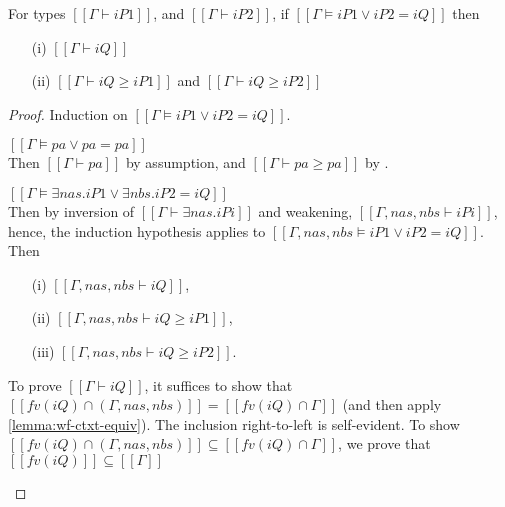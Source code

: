 \begin{lemma}
  \label{lemma:lub-soundness}
  For types $[[Γ ⊢ iP1]]$, and $[[Γ ⊢ iP2]]$,
  if $[[Γ ⊨ iP1 ∨ iP2 = iQ]]$ then
  \begin{enumerate}
    \item[(i)]  $[[Γ ⊢ iQ]]$
    \item[(ii)] $[[Γ ⊢ iQ ≥ iP1]]$ and $[[Γ ⊢ iQ ≥ iP2]]$
  \end{enumerate}
\end{lemma}
\begin{proof}
  Induction on $[[Γ ⊨ iP1 ∨ iP2 = iQ]]$.
  \begin{caseof}
  \item $[[Γ ⊨ pa ∨ pa = pa]]$\\
     Then $[[Γ ⊢ pa]]$ by assumption, and
     $[[Γ ⊢ pa ≥ pa]]$ by .
   \item $[[Γ ⊨ ∃nas.iP1 ∨ ∃nbs.iP2 = iQ]]$\\
     Then by inversion of $[[Γ ⊢ ∃nas.iPi]]$  and
     weakening, $[[Γ, {nas}, {nbs} ⊢ iPi]]$, hence, the induction
     hypothesis applies to $[[Γ, {nas}, {nbs} ⊨ iP1 ∨ iP2 = iQ]]$. Then
     \begin{itemize}
       \item[(i)] $[[Γ, {nas}, {nbs} ⊢ iQ]]$,
       \item[(ii)] $[[Γ, {nas}, {nbs} ⊢ iQ ≥ iP1]]$,
       \item[(iii)] $[[Γ, {nas}, {nbs} ⊢ iQ ≥ iP2]]$.
     \end{itemize}

     To prove $[[Γ ⊢ iQ]]$, it suffices to show that
     $[[fv(iQ) ∩ (Γ, {nas}, {nbs})]] = [[fv(iQ) ∩ Γ]]$ (and then apply \cref{lemma:wf-ctxt-equiv}).
     The inclusion right-to-left is self-evident. To show
     $[[fv(iQ) ∩ (Γ, {nas}, {nbs})]] \subseteq [[fv(iQ) ∩ Γ]]$, we prove that 
     $[[fv(iQ)]] \subseteq [[Γ]]$


\end{caseof}
\end{proof}

